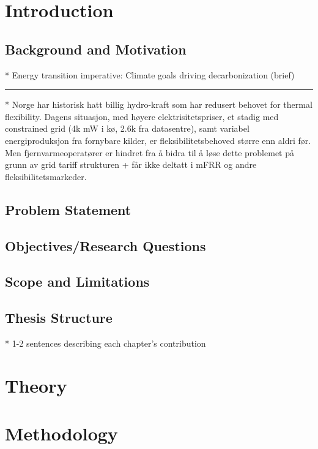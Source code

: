 \section{Introduction}


\subsection{Background and Motivation}
* Energy transition imperative: Climate goals driving decarbonization (brief)

\hrule
* Norge har historisk hatt billig hydro-kraft som har redusert behovet for thermal flexibility. Dagens situasjon, med høyere elektrisitetspriser, et stadig med constrained grid (4k mW i kø, 2.6k fra datasentre), samt variabel energiproduksjon fra fornybare kilder, er fleksibilitetsbehoved større enn aldri før. Men fjernvarmeoperatører er hindret fra å bidra til å løse dette problemet på grunn av grid tariff strukturen + får ikke deltatt i mFRR og andre fleksibilitetsmarkeder.

\subsection{Problem Statement}

\subsection{Objectives/Research Questions}

\subsection{Scope and Limitations}

\subsection{Thesis Structure}
* 1-2 sentences describing each chapter's contribution




\section{Theory}



\section{Methodology}




